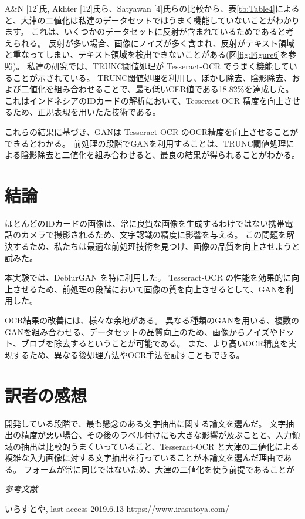 \documentclass[uplatex, twocolumn,10pt]{jsarticle}
\begin{document}
A\&N [12]氏, Akhter [12]氏ら、Satyawan [4]氏らの比較から、表\ref{tb:Table4}によると、大津の二値化は私達のデータセットではうまく機能していないことがわかります。
これは、いくつかのデータセットに反射が含まれているためであると考えられる。
反射が多い場合、画像にノイズが多く含まれ、反射がテキスト領域と重なってしまい、テキスト領域を検出できないことがある(図\ref{fig:Figure6}を参照)。
私達の研究では、TRUNC閾値処理が Tesseract-OCR でうまく機能していることが示されている。
TRUNC閾値処理を利用し、ぼかし除去、陰影除去、および二値化を組み合わせることで、最も低いCER値である18.82\%を達成した。
これはインドネシアのIDカードの解析において、Tesseract-OCR 精度を向上させるため、正規表現を用いたた技術である。

これらの結果に基づき、GANは Tesseract-OCR のOCR精度を向上させることができるとわかる。
前処理の段階でGANを利用することは、TRUNC閾値処理による陰影除去と二値化を組み合わせると、最良の結果が得られることがわかる。



\section{結論}

ほとんどのIDカードの画像は、常に良質な画像を生成するわけではない携帯電話のカメラで撮影されるため、文字認識の精度に影響を与える。
この問題を解決するため、私たちは最適な前処理技術を見つけ、画像の品質を向上させようと試みた。

本実験では、DeblurGAN を特に利用した。
Tesseract-OCR の性能を効果的に向上させるため、前処理の段階において画像の質を向上させるとして、GANを利用した。

OCR結果の改善には、様々な余地がある。
異なる種類のGANを用いる、複数のGANを組み合わせる、データセットの品質向上のため、画像からノイズやドット、ブロブを除去するということが可能である。
また、より高いOCR精度を実現するため、異なる後処理方法やOCR手法を試すこともできる。




\section{訳者の感想}
開発している段階で、最も懸念のある文字抽出に関する論文を選んだ。
文字抽出の精度が悪い場合、その後のラベル付けにも大きな影響が及ぶことと、入力領域の抽出は比較的うまくいっていること、Tesseract-OCR と大津の二値化による複雑な入力画像に対する文字抽出を行っていることが本論文を選んだ理由である。
フォームが常に同じではないため、大津の二値化を使う前提であることが

\emph{参考文献}

\begin{thebibliography}{99}
     いらすとや, last access 2019.6.13 \url{https://www.irasutoya.com/}
    
    
    
\end{thebibliography}
\end{document}
